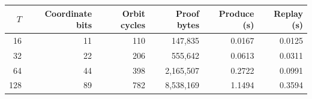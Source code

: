 \begin{tabular}{rrrrrr}
\toprule
$T$ & Coordinate bits & Orbit cycles & Proof bytes & Produce (s) & Replay (s) \\
\midrule
16 & 11 & 110 & 147,835 & 0.0167 & 0.0125 \\
32 & 22 & 206 & 555,642 & 0.0613 & 0.0311 \\
64 & 44 & 398 & 2,165,507 & 0.2722 & 0.0991 \\
128 & 89 & 782 & 8,538,169 & 1.1494 & 0.3594 \\
\bottomrule
\end{tabular}
